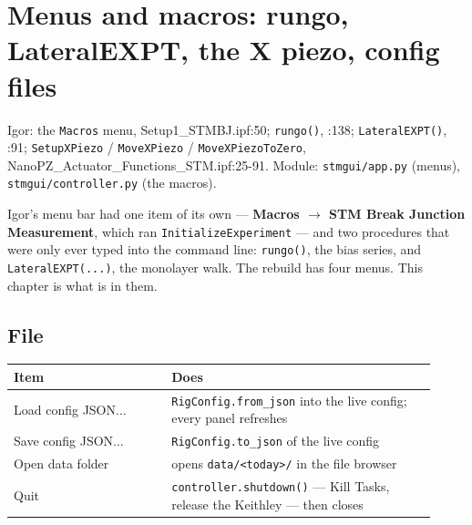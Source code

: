\setcounter{chapter}{45}
\chapter{Menus and macros: rungo, LateralEXPT, the X piezo, config files}

\begin{keybox}\small Igor: the \texttt{Macros} menu, Setup1\_STMBJ.ipf:50; \texttt{rungo()}, :138; \texttt{Lateral\discretionary{}{}{}EXPT()}, :91; \texttt{Setup\discretionary{}{}{}XPiezo} / \texttt{Move\discretionary{}{}{}XPiezo} / \texttt{Move\discretionary{}{}{}XPiezo\discretionary{}{}{}To\discretionary{}{}{}Zero}, NanoPZ\_Actuator\_Functions\_STM.ipf:25-91. Module: \texttt{stmgui/\discretionary{}{}{}app.\discretionary{}{}{}py} (menus), \texttt{stmgui/\discretionary{}{}{}controller.\discretionary{}{}{}py} (the macros).\end{keybox}

Igor's menu bar had one item of its own --- \textbf{Macros $\rightarrow$ STM Break Junction Measurement}, which ran \texttt{Initialize\discretionary{}{}{}Experiment} --- and two procedures that were only ever typed into the command line: \texttt{rungo()}, the bias series, and \texttt{Lateral\discretionary{}{}{}EXPT(.\discretionary{}{}{}.\discretionary{}{}{}.\discretionary{}{}{})}, the monolayer walk. The rebuild has four menus. This chapter is what is in them.

\section{File}

\small\setlength{\LTleft}{0pt}\setlength{\LTright}{\fill}
\begin{longtable}{@{}>{\raggedright\arraybackslash}p{0.34\linewidth}>{\raggedright\arraybackslash}p{0.58\linewidth}@{}}
\toprule
\textbf{Item} & \textbf{Does} \\
\midrule\endhead
Load config JSON... & \texttt{Rig\discretionary{}{}{}Config.\discretionary{}{}{}from\_\discretionary{}{}{}json} into the live config; every panel refreshes \\
Save config JSON... & \texttt{Rig\discretionary{}{}{}Config.\discretionary{}{}{}to\_\discretionary{}{}{}json} of the live config \\
Open data folder & opens \texttt{data/\discretionary{}{}{}<today>/\discretionary{}{}{}} in the file browser \\
Quit & \texttt{controller.\discretionary{}{}{}shutdown()} --- Kill Tasks, release the Keithley --- then closes \\
\bottomrule
\end{longtable}
\normalsize

